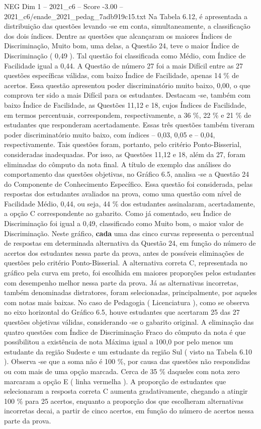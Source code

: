 \begin{textsample}{NEG Dim 1 – 2021\_c6 – Score -3.00 – 2021\_c6/enade\_2021\_pedag\_7adb919c15.txt}
Na Tabela 6.12, é apresentada a distribuição das questões levando -se em conta, simultaneamente, a classificação dos dois índices.
Dentre as questões que alcançaram os maiores Índices de Discriminação, Muito bom, uma delas, a Questão 24, teve o maior Índice de Discriminação ( 0,49 ).
Tal questão foi classificada como Médio, com Índice de Facilidade igual a 0,44.
A Questão de número 27 foi a mais Difícil entre as 27 questões específicas válidas, com baixo Índice de Facilidade, apenas 14 \% de acertos.
Essa questão apresentou poder discriminatório muito baixo, 0,00, o que comprova ter sido a mais Difícil para os estudantes.
Destacam -se, também com baixo Índice de Facilidade, as Questões 11,12 e 18, cujos Índices de Facilidade, em termos percentuais, correspondem, respectivamente, a 36 \%, 22 \% e 21 \% de estudantes que responderam acertadamente.
Essas três questões também tiveram poder discriminatório muito baixo, com índices – 0,03, 0,05 e – 0,04, respectivamente.
Tais questões foram, portanto, pelo critério Ponto-Bisserial, consideradas inadequadas.
Por isso, as Questões 11,12 e 18, além da 27, foram eliminadas do cômputo da nota final.
A título de exemplo das análises do comportamento das questões objetivas, no Gráfico 6.5, analisa -se a Questão 24 do Componente de Conhecimento Específico.
Essa questão foi considerada, pelas respostas dos estudantes avaliados na prova, como uma questão com nível de Facilidade Médio, 0,44, ou seja, 44 \% dos estudantes assinalaram, acertadamente, a opção C correspondente ao gabarito.
Como já comentado, seu Índice de Discriminação foi igual a 0,49, classificado como Muito bom, o maior valor de Discriminação.
Neste gráfico, \textbf{cada} uma das cinco curvas representa o percentual de respostas em determinada alternativa da Questão 24, em função do número de acertos dos estudantes nessa parte da prova, antes de possíveis eliminações de questões pelo critério Ponto-Bisserial.
A alternativa correta C, representada no gráfico pela curva em preto, foi escolhida em maiores proporções pelos estudantes com desempenho melhor nessa parte da prova.
Já as alternativas incorretas, também denominadas distratores, foram selecionadas, principalmente, por aqueles com notas mais baixas.
No caso de Pedagogia ( Licenciatura ), como se observa no eixo horizontal do Gráfico 6.5, houve estudantes que acertaram 25 das 27 questões objetivas válidas, considerando -se o gabarito original.
A eliminação das quatro questões com Índice de Discriminação Fraco do cômputo da nota é que possibilitou a existência de nota Máxima igual a 100,0 por pelo menos um estudante da região Sudeste e um estudante da região Sul ( visto na Tabela 6.10 ).
Observa -se que a soma não é 100 \%, por causa das questões não respondidas ou com mais de uma opção marcada.
Cerca de 35 \% daqueles com nota zero marcaram a opção E ( linha vermelha ).
A proporção de estudantes que selecionaram a resposta correta C aumenta gradativamente, chegando a atingir 100 \% para 25 acertos, enquanto a proporção dos que escolheram alternativas incorretas decai, a partir de cinco acertos, em função do número de acertos nessa parte da prova.

\end{textsample}
